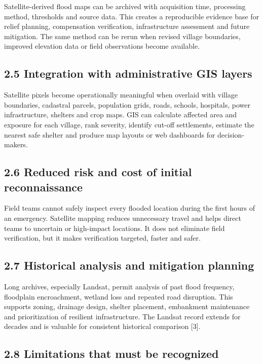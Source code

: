 \documentclass[11pt,a4paper]{article}
\begin{document}
Satellite-derived flood maps can be archived with acquisition time, processing method, thresholds and source data. This creates a reproducible evidence base for relief planning, compensation verification, infrastructure assessment and future mitigation. The same method can be rerun when revised village boundaries, improved elevation data or field observations become available.

\subsection{2.5 Integration with administrative GIS layers}\label{integration-with-administrative-gis-layers}

Satellite pixels become operationally meaningful when overlaid with village boundaries, cadastral parcels, population grids, roads, schools, hospitals, power infrastructure, shelters and crop maps. GIS can calculate affected area and exposure for each village, rank severity, identify cut-off settlements, estimate the nearest safe shelter and produce map layouts or web dashboards for decision-makers.

\subsection{2.6 Reduced risk and cost of initial reconnaissance}\label{reduced-risk-and-cost-of-initial-reconnaissance}

Field teams cannot safely inspect every flooded location during the first hours of an emergency. Satellite mapping reduces unnecessary travel and helps direct teams to uncertain or high-impact locations. It does not eliminate field verification, but it makes verification targeted, faster and safer.

\subsection{2.7 Historical analysis and mitigation planning}\label{historical-analysis-and-mitigation-planning}

Long archives, especially Landsat, permit analysis of past flood frequency, floodplain encroachment, wetland loss and repeated road disruption. This supports zoning, drainage design, shelter placement, embankment maintenance and prioritization of resilient infrastructure. The Landsat record extends for decades and is valuable for consistent historical comparison {[}3{]}.

\subsection{2.8 Limitations that must be recognized}\label{limitations-that-must-be-recognized}
\end{document}
